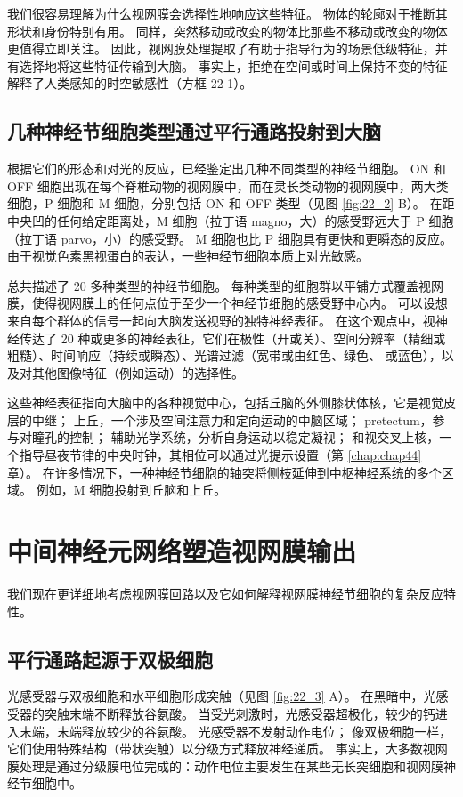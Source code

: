 我们很容易理解为什么视网膜会选择性地响应这些特征。 
物体的轮廓对于推断其形状和身份特别有用。 
同样，突然移动或改变的物体比那些不移动或改变的物体更值得立即关注。 
因此，视网膜处理提取了有助于指导行为的场景低级特征，并有选择地将这些特征传输到大脑。 
事实上，拒绝在空间或时间上保持不变的特征解释了人类感知的时空敏感性（方框 22-1）。


\subsection{几种神经节细胞类型通过平行通路投射到大脑}
根据它们的形态和对光的反应，已经鉴定出几种不同类型的神经节细胞。 
ON 和 OFF 细胞出现在每个脊椎动物的视网膜中，而在灵长类动物的视网膜中，两大类细胞，P 细胞和 M 细胞，分别包括 ON 和 OFF 类型（见图 \ref{fig:22_2} B）。 
在距中央凹的任何给定距离处，M 细胞（拉丁语 magno，大）的感受野远大于 P 细胞（拉丁语 parvo，小）的感受野。 
M 细胞也比 P 细胞具有更快和更瞬态的反应。 
由于视觉色素黑视蛋白的表达，一些神经节细胞本质上对光敏感。


总共描述了 20 多种类型的神经节细胞。 
每种类型的细胞群以平铺方式覆盖视网膜，使得视网膜上的任何点位于至少一个神经节细胞的感受野中心内。 
可以设想来自每个群体的信号一起向大脑发送视野的独特神经表征。 
在这个观点中，视神经传达了 20 种或更多的神经表征，它们在极性（开或关）、空间分辨率（精细或粗糙）、时间响应（持续或瞬态）、光谱过滤（宽带或由红色、绿色、 或蓝色），以及对其他图像特征（例如运动）的选择性。


这些神经表征指向大脑中的各种视觉中心，包括丘脑的外侧膝状体核，它是视觉皮层的中继； 上丘，一个涉及空间注意力和定向运动的中脑区域； pretectum，参与对瞳孔的控制； 辅助光学系统，分析自身运动以稳定凝视； 和视交叉上核，一个指导昼夜节律的中央时钟，其相位可以通过光提示设置（第 \ref{chap:chap44} 章）。 
在许多情况下，一种神经节细胞的轴突将侧枝延伸到中枢神经系统的多个区域。 
例如，M 细胞投射到丘脑和上丘。


\section{中间神经元网络塑造视网膜输出}
我们现在更详细地考虑视网膜回路以及它如何解释视网膜神经节细胞的复杂反应特性。

\subsection{平行通路起源于双极细胞}
光感受器与双极细胞和水平细胞形成突触（见图 \ref{fig:22_3} A）。 
在黑暗中，光感受器的突触末端不断释放谷氨酸。 
当受光刺激时，光感受器超极化，较少的钙进入末端，末端释放较少的谷氨酸。 
光感受器不发射动作电位； 像双极细胞一样，它们使用特殊结构（带状突触）以分级方式释放神经递质。 
事实上，大多数视网膜处理是通过分级膜电位完成的：动作电位主要发生在某些无长突细胞和视网膜神经节细胞中。


